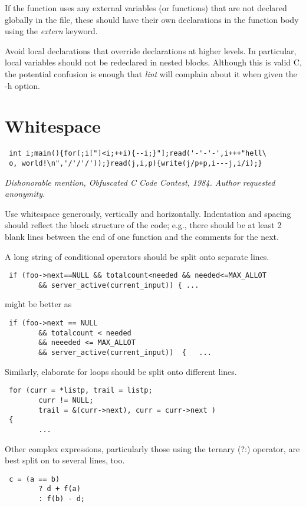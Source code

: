  If the function uses any external variables (or functions) that are not
declared globally in the file, these should have their own declarations in the
function body using the {\em extern} keyword. 

 Avoid local declarations that override declarations at higher levels. In
particular, local variables should not be redeclared in nested blocks. Although
this is valid C, the potential confusion is enough that {\em lint} will complain
about it when given the -h option.
\newpage
\section{Whitespace}
\begin{verbatim}
 int i;main(){for(;i["]<i;++i){--i;}"];read('-'-'-',i+++"hell\
 o, world!\n",'/'/'/'));}read(j,i,p){write(j/p+p,i---j,i/i);}
\end{verbatim}
{\em Dishonorable mention, Obfuscated C Code Contest, 1984.  Author requested
anonymity.}

 Use whitespace generously, vertically and horizontally. Indentation and
spacing should reflect the block structure of the code; e.g., there should be
at least 2 blank lines between the end of one function and the comments for the
next. 

 A long string of conditional operators should be split onto separate lines. 
\begin{verbatim}
 if (foo->next==NULL && totalcount<needed && needed<=MAX_ALLOT
        && server_active(current_input)) { ... 
\end{verbatim}
might be better as 
\begin{verbatim}
 if (foo->next == NULL
        && totalcount < needed
        && neeeded <= MAX_ALLOT
        && server_active(current_input))  {   ... 
\end{verbatim}
Similarly, elaborate for loops should be split onto different lines. 
\begin{verbatim}
 for (curr = *listp, trail = listp;
        curr != NULL;
        trail = &(curr->next), curr = curr->next )
 {
        ... 
\end{verbatim}

Other complex expressions, particularly those using the ternary (?:) operator,
are best split on to several lines, too. 
\begin{verbatim}
 c = (a == b)
        ? d + f(a)
        : f(b) - d; 
\end{verbatim}
\newpage
